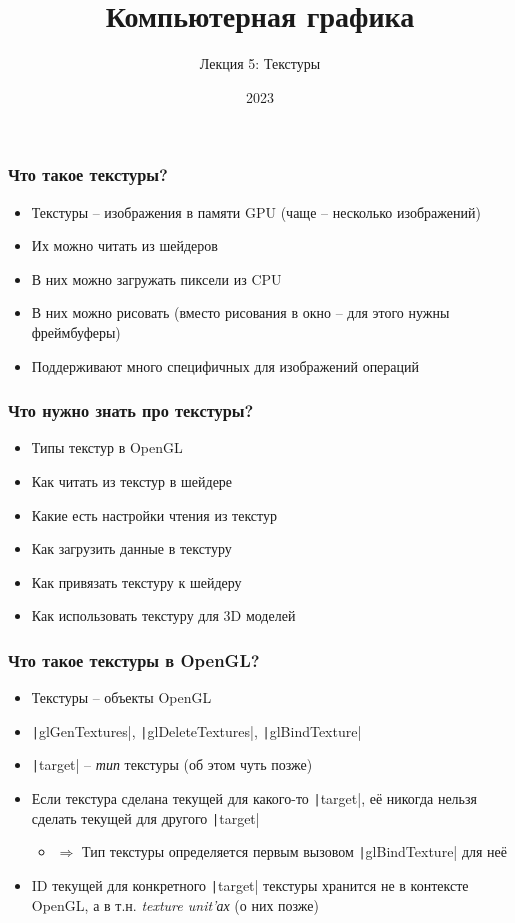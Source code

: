 \documentclass[10pt]{beamer}
\title{Компьютерная графика}
\subtitle{Лекция 5: Текстуры}
\date{2023}
\begin{document}
\frame{\titlepage}

\begin{frame}[fragile]
\frametitle{Что такое текстуры?}
\begin{itemize}
\item Текстуры -- изображения в памяти GPU (чаще -- несколько изображений)
\pause
\item Их можно читать из шейдеров
\pause
\item В них можно загружать пиксели из CPU
\pause
\item В них можно рисовать (вместо рисования в окно -- для этого нужны фреймбуферы)
\pause
\item Поддерживают много специфичных для изображений операций
\end{itemize}
\end{frame}

\begin{frame}[fragile]
\frametitle{Что нужно знать про текстуры?}
\begin{itemize}
\item Типы текстур в OpenGL
\pause
\item Как читать из текстур в шейдере
\pause
\item Какие есть настройки чтения из текстур
\pause
\item Как загрузить данные в текстуру
\pause
\item Как привязать текстуру к шейдеру
\pause
\item Как использовать текстуру для 3D моделей
\end{itemize}
\end{frame}

\begin{frame}[fragile]
\frametitle{Что такое текстуры в OpenGL?}
\begin{itemize}
\item Текстуры -- объекты OpenGL
\pause
\item \texttt|glGenTextures|, \texttt|glDeleteTextures|, \texttt|glBindTexture|
\pause
\item \texttt|target| -- \textit{тип} текстуры (об этом чуть позже)
\pause
\item Если текстура сделана текущей для какого-то \texttt|target|, её никогда нельзя сделать текущей для другого \texttt|target|
\begin{itemize}
\item \begin{math}\Longrightarrow\end{math} Тип текстуры определяется первым вызовом \texttt|glBindTexture| для неё
\end{itemize}
\pause
\item ID текущей для конкретного \texttt|target| текстуры хранится не в контексте OpenGL, а в т.н. \textit{texture unit'ах} (о них позже)
\end{itemize}
\end{frame}
\end{document}
